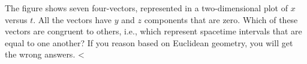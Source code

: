 The figure shows seven four-vectors, represented in a two-dimensional
plot of $x$ versus $t$. All the vectors have $y$ and $z$ components
that are zero. Which of these vectors are congruent to others, i.e.,
which represent spacetime intervals that are equal to one another?
If you reason based on Euclidean geometry, you will get the wrong answers.
<%
